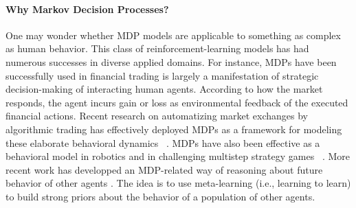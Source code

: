 \documentclass[10pt,letterpaper]{article}
\begin{document}
\paragraph*{Why Markov Decision Processes?} One may wonder whether MDP models
are applicable to something as complex as human behavior. This class of
reinforcement-learning models has had numerous successes in diverse applied domains. For instance, MDPs have been successfully used in financial trading is largely a manifestation of strategic decision-making of interacting human agents. According to how the market responds, the agent incurs gain or loss as environmental feedback of the executed financial actions. Recent research on automatizing market exchanges by algorithmic trading has effectively deployed MDPs as a framework for modeling these elaborate behavioral dynamics  ~\citep{brazdil2017,yang15,yang14,yang12,dempster2006,hult2010, abergel2017}.
%
MDPs have also been effective as a behavioral model in robotics
\citep{ng2004,abbeel2004} and in challenging multistep strategy games
~\citep{mnih2015,silver2016mastering,pritzel2017neural}. 
More recent work has
developped an MDP-related way of reasoning about future behavior
of other agents \citep{robinowitz2018}.
The idea is to use meta-learning (i.e., learning to learn) to build strong priors
about the behavior of a population of other agents.




\end{document}
